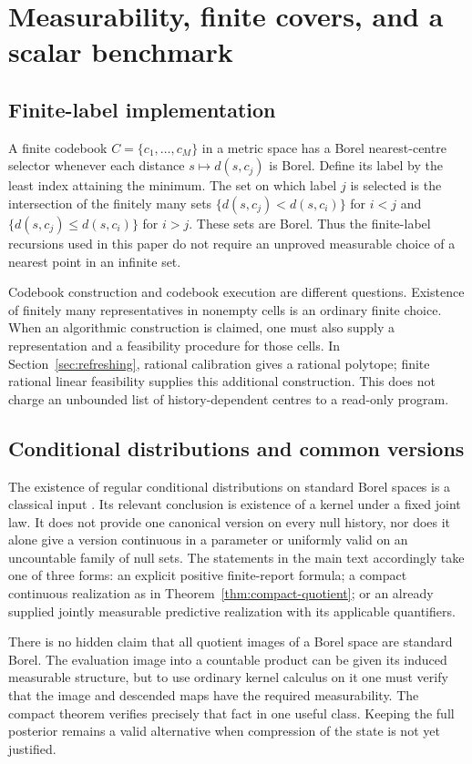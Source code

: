 \section{Measurability, finite covers, and a scalar benchmark}
\label{app:measurable}
\subsection{Finite-label implementation}
A finite codebook $C=\{c_1,\ldots,c_M\}$ in a metric space has a Borel
nearest-centre selector whenever each distance $s\mapsto d(s,c_j)$ is
Borel. Define its label by the least index attaining the minimum. The set
on which label $j$ is selected is the intersection of the finitely many
sets $\{d(s,c_j)<d(s,c_i)\}$ for $i<j$ and
$\{d(s,c_j)\le d(s,c_i)\}$ for $i>j$. These sets are Borel. Thus the
finite-label recursions used in this paper do not require an unproved
measurable choice of a nearest point in an infinite set.

Codebook construction and codebook execution are different questions.
Existence of finitely many representatives in nonempty cells is an ordinary
finite choice. When an algorithmic construction is claimed, one must also
supply a representation and a feasibility procedure for those cells. In
Section~\ref{sec:refreshing}, rational calibration gives a rational
polytope; finite rational linear feasibility supplies this additional
construction. This does not charge an unbounded list of history-dependent
centres to a read-only program.

\subsection{Conditional distributions and common versions}
The existence of regular conditional distributions on standard Borel
spaces is a classical input \cite{Kallenberg2021}. Its relevant conclusion
is existence of a kernel under a fixed joint law. It does not provide one
canonical version on every null history, nor does it alone give a version
continuous in a parameter or uniformly valid on an uncountable family of
null sets. The statements in the main text accordingly take one of three
forms: an explicit positive finite-report formula; a compact continuous
realization as in Theorem~\ref{thm:compact-quotient}; or an already supplied
jointly measurable predictive realization with its applicable quantifiers.

There is no hidden claim that all quotient images of a Borel space are
standard Borel. The evaluation image into a countable product can be given
its induced measurable structure, but to use ordinary kernel calculus on
it one must verify that the image and descended maps have the required
measurability. The compact theorem verifies precisely that fact in one
useful class. Keeping the full posterior remains a valid alternative when
compression of the state is not yet justified.


